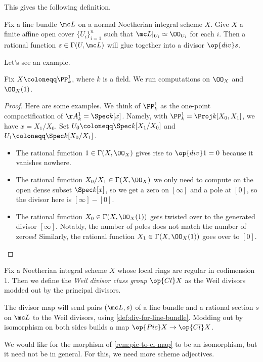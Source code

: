 \documentclass[../notes.tex]{subfiles}
\begin{document}
This gives the following definition.
\begin{definition} \label{def:div-for-line-bundle}
	Fix a line bundle $\mc L$ on a normal Noetherian integral scheme $X$. Give $X$ a finite affine open cover $\{U_i\}_{i=1}^n$ such that $\mc L|_{U_i}\simeq\OO_{U_i}$ for each $i$. Then a rational function $s\in\Gamma(U,\mc L)$ will glue together into a divisor $\op{div}s$.
\end{definition}
Let's see an example.
\begin{exe}
	Fix $X\coloneqq\PP^1_k$, where $k$ is a field. We run computations on $\OO_X$ and $\OO_X(1)$.
\end{exe}
\begin{proof}
	Here are some examples. We think of $\PP^1_k$ as the one-point compactification of $\AA^1_k=\Spec k[x]$. Namely, with $\PP^1_k=\Proj k[X_0,X_1]$, we have $x=X_1/X_0$. Set $U_0\coloneqq\Spec k[X_1/X_0]$ and $U_1\coloneqq\Spec k[X_0/X_1]$.
	\begin{itemize}
		\item The rational function $1\in\Gamma(X,\OO_X)$ gives rise to $\op{div}1=0$ because it vanishes nowhere.
		\item The rational function $X_0/X_1\in\Gamma(X,\OO_X)$ we only need to compute on the open dense subset $\Spec k[x]$, so we get a zero on $[\infty]$ and a pole at $[0]$, so the divisor here is $[\infty]-[0]$.
		\item The rational function $X_0\in\Gamma(X,\OO_X(1))$ gets twisted over to the generated divisor $[\infty]$. Notably, the number of poles does not match the number of zeroes! Similarly, the rational function $X_1\in\Gamma(X,\OO_X(1))$ goes over to $[0]$.
		\qedhere
	\end{itemize}
\end{proof}
\begin{definition}
	Fix a Noetherian integral scheme $X$ whose local rings are regular in codimension $1$. Then we define the \textit{Weil divisor class group} $\op{Cl}X$ as the Weil divisors modded out by the principal divisors.
\end{definition}
\begin{remark} \label{rem:pic-to-cl-map}
	The divisor map will send pairs $(\mc L,s)$ of a line bundle and a rational section $s$ on $\mc L$ to the Weil divisors, using \autoref{def:div-for-line-bundle}. Modding out by isomorphism on both sides builds a map $\op{Pic}X\to\op{Cl}X$.
\end{remark}
We would like for the morphism of \autoref{rem:pic-to-cl-map} to be an isomorphism, but it need not be in general. For this, we need more scheme adjectives.
\end{document}
